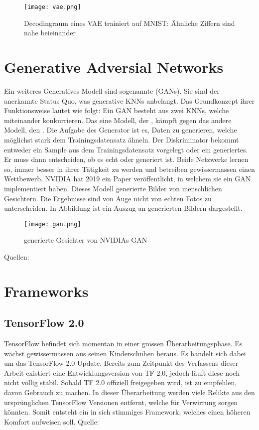\begin{figure}[h!]
  \centering
  \texttt{[image: vae.png]}
  \caption{Decodingraum eines VAE trainiert auf MNIST: Ähnliche Ziffern sind
    nahe beieinander \cite{res:vae}}
  \label{fig:vae}
\end{figure}

\cite{wiki:autoencoder}

\section*{Generative Adversial Networks}
Ein weiteres Generatives Modell sind sogenannte  (GANs). Sie sind der anerkannte Status Quo, was generative KNNs
anbelangt.
\para{}
Das Grundkonzept ihrer Funktionsweise lautet wie folgt: Ein GAN besteht aus zwei
KNNs, welche miteinander konkurrieren. Das eine Modell, der
, kämpft gegen das andere Modell, den .
Die Aufgabe des Generator ist es, Daten zu generieren, welche möglichst stark
dem Trainingsdatensatz ähneln. Der Diskriminator bekommt entweder
ein Sample aus dem Trainingsdatensatz vorgelegt oder ein generiertes.
Er muss dann entscheiden, ob es echt oder generiert ist. Beide Netzwerke lernen so,
immer besser in ihrer Tätigkeit zu werden und betreiben gewissermassen einen Wettbewerb.
\para{}
NVIDIA hat 2019 ein Paper veröffentlicht, in welchem sie ein GAN implementiert
haben. Dieses Modell generierte Bilder von menschlichen Gesichtern. Die
Ergebnisse sind von Auge nicht von echten Fotos zu unterscheiden.
In Abbildung  ist ein Auszug an generierten Bildern dargestellt.

\begin{figure}[h!]
  \centering
  \texttt{[image: gan.png]}
  \caption{generierte Gesichter von NVIDIAs GAN \cite{paper:gan}}
  \label{fig:nvidia_gan}
\end{figure}
\para{}
Quellen: \cite{paper:gan}

\section*{Frameworks}
\subsection*{TensorFlow 2.0}
TensorFlow befindet sich momentan in einer grossen Überarbeitungsphase. Es
wächst gewissermassen aus seinen Kinderschuhen heraus. Es handelt sich dabei um das
TensorFlow 2.0 Update. Bereits zum Zeitpunkt des Verfassens dieser Arbeit
existiert eine Entwicklungsversion von TF 2.0, jedoch läuft diese noch nicht
völlig stabil. Sobald TF 2.0 offiziell freigegeben wird, ist zu empfehlen,
davon Gebrauch zu machen. In dieser Überarbeitung werden viele Relikte aus den
ursprünglichen TensorFlow Versionen entfernt, welche für Verwirrung sorgen
könnten. Somit entsteht ein in sich stimmiges Framework, welches einen höheren
Komfort aufweisen soll.
\para{}
Quelle: \cite{net:tf_2.0}


